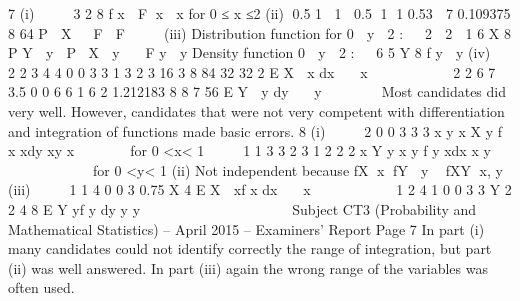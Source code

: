 \documentclass[a4paper,12pt]{article}
\begin{document}
  
  7 (i)     3 2
  8
  f x  F x  x for 0 ≤ x ≤2
  (ii) 0.5 1 1 0.5 1 1 0.53  7 0.109375
  8 64
  P  X   F  F    
  (iii) Distribution function for 0  y  2 :
      2  2  1 6
  X 8 P Y  y  P X  y   F y  y
  Density function 0  y  2 :
      6 5
  Y 8 f y  y
  (iv)  
  2 2
  3 4 4
  0 0
  3 3 1 3 2 3 16 3
  8 84 32 32 2
  E X  x dx   x       
   
  2 2
  6 7 3.5
  0 0
  6 6 1 6 2 1.212183
  8 8 7 56
  E Y  y dy   y      
  Most candidates did very well. However, candidates that were not very competent with
  differentiation and integration of functions made basic errors.
  8 (i)     2
  0
  0
  3 3 3
  x
  y x
  X y f x xdy xy x 
       for 0 <x< 1
      1 1
  3 3 2 3 1 2
  2 2
  x
  Y
  y x y
  f y xdx x y
  
  
           for 0 <y< 1
  (ii) Not independent because fX x fY  y  fXY x, y
  (iii)    
  1 1
  4
  0 0
  3 0.75
  X 4 E X  xf x dx   x     
     
  1 2 4 1
  0 0
  3 3
  Y 2 2 4 8
  E Y yf y dy y y
    
           
  
  Subject CT3 (Probability and Mathematical Statistics) – April 2015 – Examiners’ Report
  Page 7
  In part (i) many candidates could not identify correctly the range of integration, but part (ii)
  was well answered. In part (iii) again the wrong range of the variables was often used.
\end{document}
